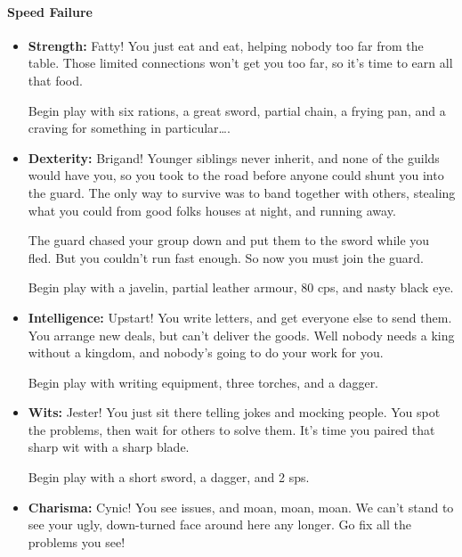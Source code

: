 \exampleRandomCharacter %
\begin{multicols}{2}

\paragraph{Speed Failure}

\begin{itemize}

  \item
  \textbf{Strength:}
  Fatty!
  You just eat and eat, helping nobody too far from the table.
  Those limited connections won't get you too far, so it's time to earn all that food.

  Begin play with six rations, a great sword, partial chain, a frying pan, and a craving for something in particular\ldots.

  \item
  \textbf{Dexterity:}
  Brigand!
  Younger siblings never inherit, and none of the guilds would have you, so you took to the road before anyone could shunt you into the \gls{guard}.
  The only way to survive was to band together with others, stealing what you could from good folks houses at night, and running away.

  The \gls{guard} chased your group down and put them to the sword while you fled.
  But you couldn't run fast enough.
  So now you must join the guard.

  Begin play with a javelin, partial leather armour, 80 \glspl{cp}, and nasty black eye.
  \item
  \textbf{Intelligence:}
  Upstart!
  You write letters, and get everyone else to send them.
  You arrange new deals, but can't deliver the goods.
  Well nobody needs a king without a kingdom, and nobody's going to do your work for you.

  Begin play with writing equipment, three torches, and a dagger.
  \item
  \textbf{Wits:}
  Jester!
  You just sit there telling jokes and mocking people.
  You spot the problems, then wait for others to solve them.
  It's time you paired that sharp wit with a sharp blade.

  Begin play with a short sword, a dagger, and 2 \glspl{sp}.
  \item
  \textbf{Charisma:}
  Cynic!
  You see issues, and moan, moan, moan.
  We can't stand to see your ugly, down-turned face around here any longer.
  Go fix all the problems you see!


\end{itemize}
\end{multicols}
